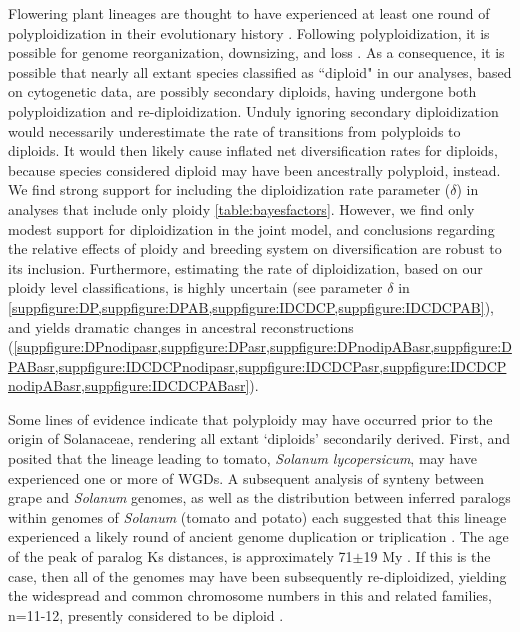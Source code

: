 Flowering plant lineages are thought to have experienced at least one round of polyploidization in their evolutionary history \citep{soltis_2015}. 
Following polyploidization, it is possible for genome reorganization, downsizing, and loss \citep{dodsworth_2015, zenil_2016, mandakova_2018}. %
As a consequence, it is possible that nearly all extant species classified as ``diploid" in our analyses, based on cytogenetic data, are possibly secondary diploids, having undergone both polyploidization and re-diploidization.
Unduly ignoring secondary diploidization would necessarily underestimate the rate of transitions from polyploids to diploids.
It would then likely cause inflated net diversification rates for diploids, because species considered diploid may have been ancestrally polyploid, instead. %
We find strong support for including the diploidization rate parameter ($\delta$) in analyses that include only ploidy \cref{table:bayesfactors}. %
However, we find only modest support for diploidization in the joint model, and conclusions regarding the relative effects of ploidy and breeding system on diversification are robust to its inclusion.
Furthermore, estimating the rate of diploidization, based on our ploidy level classifications, is highly uncertain (see parameter $\delta$ in \cref{suppfigure:DP,suppfigure:DPAB,suppfigure:IDCDCP,suppfigure:IDCDCPAB}), and yields dramatic changes in ancestral reconstructions (\cref{suppfigure:DPnodipasr,suppfigure:DPasr,suppfigure:DPnodipABasr,suppfigure:DPABasr,suppfigure:IDCDCPnodipasr,suppfigure:IDCDCPasr,suppfigure:IDCDCPnodipABasr,suppfigure:IDCDCPABasr}).


Some lines of evidence indicate that polyploidy may have occurred prior to the origin of Solanaceae, rendering all extant `diploids' secondarily derived. %
First, \citet{ku2000} and \citet{blanc2004} posited that the lineage leading to tomato, \textit{Solanum lycopersicum}, may have experienced one or more of WGDs.
A subsequent analysis of synteny between grape and \textit{Solanum} genomes, as well as the distribution between inferred paralogs within genomes of \textit{Solanum} (tomato and potato) each suggested that this lineage experienced a likely round of ancient genome duplication or triplication \citep{tomato2012}. 
The age of the peak of paralog Ks distances, is approximately 71$\pm$19 My \citep{tomato2012}. 
If this is the case, then all of the genomes may have been subsequently re-diploidized, yielding the widespread and common chromosome numbers in this and related families, n=11-12, presently considered to be diploid \citep{robertson_2011}. 

